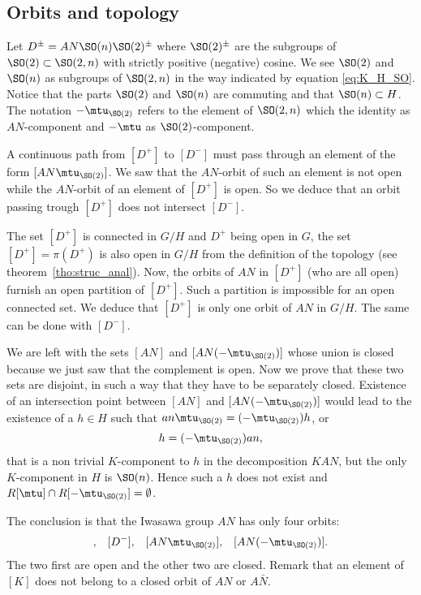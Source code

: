 \subsection{Orbits  and topology}
\label{PgTopoOrb}

Let  $D^{\pm}=AN\SO(n)\SO(2)^{\pm}$ where $\SO(2)^{\pm}$ are the subgroups of $\SO(2)\subset \SO(2,n)$ with strictly positive (negative) cosine. We see $\SO(2)$ and $\SO(n)$ as subgroups of $\SO(2,n)$ in the way indicated by equation \eqref{eq:K_H_SO}. Notice that the parts $\SO(2)$ and $\SO(n)$ are commuting and that $\SO(n)\subset H$. The notation $-\mtu_{\SO(2)}$ refers to the element of $\SO(2,n)$ which the identity as $AN$-component and $-\mtu$ as $\SO(2)$-component.

A continuous path from $[D^+]$ to $[D^-]$ must pass through an element of the form $[AN\mtu_{\SO(2)}]$. We saw that the $AN$-orbit of such an element is not open while the $AN$-orbit of an element of $[D^+]$ is open. So we deduce that an orbit passing trough $[D^+]$ does not intersect $[D^-]$.

The set $[D^+]$ is connected in $G/H$ and $D^+$  being open in $G$, the set $[D^+]=\pi(D^+)$ is also open in $G/H$ from the definition of the topology (see theorem~\ref{tho:struc_anal}). Now, the orbits of $AN$ in $[D^+]$ (who are all open) furnish an open partition of $[D^+]$. Such a partition is impossible for an open connected set. We deduce that $[D^+]$ is only one orbit of $AN$ in $G/H$. The same can be done with $[D^-]$.

We are left with the sets $[AN]$ and $[AN(-\mtu_{\SO(2)})]$ whose union is closed because we just saw that the complement is open. Now we prove that these two sets are disjoint, in such a way that they have to be separately closed. Existence of an intersection point between $[AN]$ and $[AN(-\mtu_{\SO(2)})]$ would lead to the existence of a $h\in H$ such that $an\mtu_{\SO(2)}=(-\mtu_{\SO(2)})h$, or
\[
	h=(-\mtu_{\SO(2)})an,
\]
that is a non trivial $K$-component to $h$ in the decomposition $KAN$, but the only $K$-component in $H$ is $\SO(n)$. Hence such a $h$ does not exist and $R[\mtu]\cap R[-\mtu_{\SO(2)}]=\emptyset$.

The conclusion is that the Iwasawa group $AN$ has only four orbits:
\begin{align}
	[D^+], &  & [D^-], &  & [AN\mtu_{\SO(2)}], &  & [AN(-\mtu_{\SO(2)})].
\end{align}
The two first are open and the other two are closed. Remark\label{PgNoticeKpassung} that an element of $[K]$ does not belong to a closed orbit of $AN$ or $A\bar N$.


